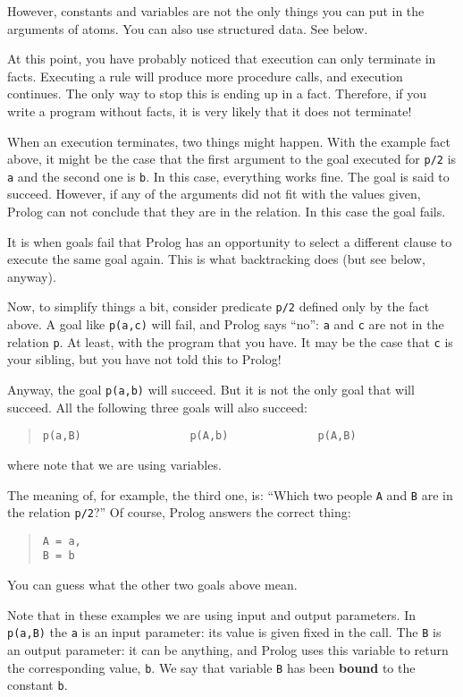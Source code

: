 However, constants and variables are not the only things you can put in
the arguments of atoms. You can also use structured data. See below.

At this point, you have probably noticed that execution can only
terminate in facts. Executing a rule will produce more procedure
calls, and execution continues. The only way to stop this is ending up
in a fact. Therefore, if you write a program without facts, it is very
likely that it does not terminate!

When an execution terminates, two things might happen. With the example
fact above, it might be the case that the first argument to the 
goal executed for \verb+p/2+ is \verb+a+ and the second one is
\verb+b+. In this case, everything works fine. The goal is said to
succeed. However, if any of the arguments did not fit with the values
given, Prolog can not conclude that they are in the relation. In this
case the goal fails.

It is when goals fail that Prolog has an opportunity to select a
different clause to execute the same goal again. This is what
backtracking does (but see below, anyway).

Now, to simplify things a bit, consider predicate \verb+p/2+ defined
only by the fact above. A goal like \verb+p(a,c)+ will fail, and
Prolog says ``no'': \verb+a+ and \verb+c+ are not in the relation
\verb+p+. At least, with the program that you have. It may be the case
that \verb+c+ is your sibling, but you have not told this to Prolog!

Anyway, the goal \verb+p(a,b)+ will succeed. But it is not the only
goal that will succeed. All the following three goals will also
succeed:
\begin{quote}
\begin{verbatim}
p(a,B)                 p(A,b)              p(A,B)
\end{verbatim}
\end{quote}
%
where note that we are using variables.

The meaning of, for example, the third one, is: ``Which two people
\verb+A+ and \verb+B+ are in the relation \verb+p/2+?'' Of course,
Prolog answers the correct thing:
\begin{quote}
\begin{verbatim}
A = a,
B = b
\end{verbatim}
\end{quote}
%
You can guess what the other two goals above mean.

Note that in these examples we are using input and output
parameters. In \verb+p(a,B)+ the \verb+a+ is an input parameter: its
value is given fixed in the call. The \verb+B+ is an output parameter:
it can be anything, and Prolog uses this variable to return the
corresponding value, \verb+b+. We say that variable \verb+B+ has been
{\bf bound} to the constant \verb+b+.

